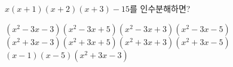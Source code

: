 $x(x+1)(x+2)(x+3)-15$를 인수분해하면?
\begin{choicesv}{$(x^2-3x-3)(x^2-3x+5)$}{$(x^2-3x+3)(x^2-3x-5)$}{$(x^2+3x-3)(x^2+3x+5)$}{$(x^2+3x+3)(x^2+3x-5)$}{$(x-1)(x-5)(x^2+3x-3)$}\end{choicesv}

